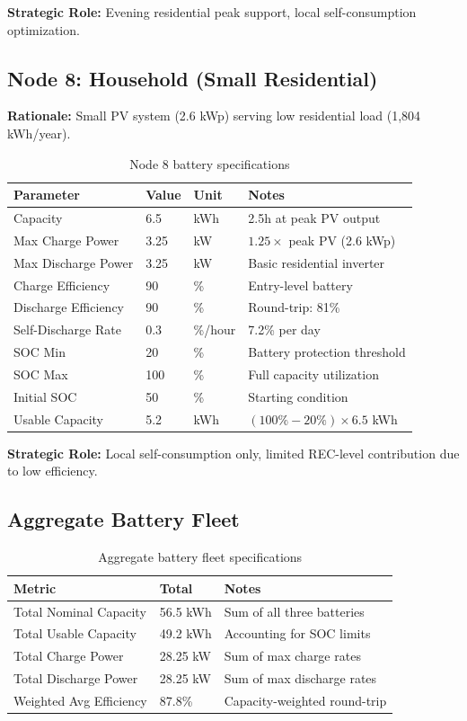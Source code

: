 \documentclass[11pt,a4paper]{article}
\begin{document}
\textbf{Strategic Role:} Evening residential peak support, local self-consumption optimization.

\subsection{Node 8: Household (Small Residential)}

\textbf{Rationale:} Small PV system (2.6 kWp) serving low residential load (1,804 kWh/year).

\begin{table}[h]
\centering
\small
\begin{tabular}{@{}llll@{}}
\toprule
\textbf{Parameter} & \textbf{Value} & \textbf{Unit} & \textbf{Notes} \\ 
\midrule
Capacity & 6.5 & kWh & 2.5h at peak PV output \\
Max Charge Power & 3.25 & kW & $1.25\times$ peak PV (2.6 kWp) \\
Max Discharge Power & 3.25 & kW & Basic residential inverter \\
Charge Efficiency & 90 & \% & Entry-level battery \\
Discharge Efficiency & 90 & \% & Round-trip: 81\% \\
Self-Discharge Rate & 0.3 & \%/hour & 7.2\% per day \\
SOC Min & 20 & \% & Battery protection threshold \\
SOC Max & 100 & \% & Full capacity utilization \\
Initial SOC & 50 & \% & Starting condition \\
Usable Capacity & 5.2 & kWh & $(100\% - 20\%) \times 6.5$ kWh \\
\bottomrule
\end{tabular}
\caption{Node 8 battery specifications}
\end{table}

\textbf{Strategic Role:} Local self-consumption only, limited REC-level contribution due to low efficiency.

\subsection{Aggregate Battery Fleet}

\begin{table}[h]
\centering
\begin{tabular}{@{}lll@{}}
\toprule
\textbf{Metric} & \textbf{Total} & \textbf{Notes} \\ 
\midrule
Total Nominal Capacity & 56.5 kWh & Sum of all three batteries \\
Total Usable Capacity & 49.2 kWh & Accounting for SOC limits \\
Total Charge Power & 28.25 kW & Sum of max charge rates \\
Total Discharge Power & 28.25 kW & Sum of max discharge rates \\
Weighted Avg Efficiency & 87.8\% & Capacity-weighted round-trip \\
\bottomrule
\end{tabular}
\caption{Aggregate battery fleet specifications}
\end{table}
\end{document}
